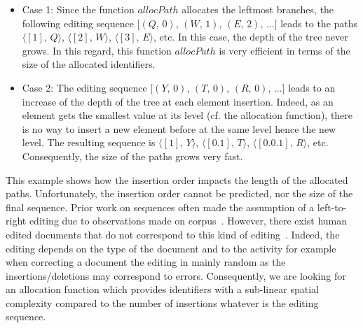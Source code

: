 \begin{itemize}[leftmargin=*]
\item Case 1: Since the function $allocPath$ allocates the leftmost branches,
  the following editing sequence $[(Q,\,0)$, $(W,\,1)$, $(E,\,2)$, $\ldots]$
  leads to the paths $\langle [1],\, Q\rangle$, $\langle [2],\, W\rangle$,
  $\langle [3],\, E\rangle$, etc. In this case, the depth of the tree never
  grows. In this regard, this function $allocPath$ is very efficient in terms
  of the size of the allocated identifiers.

\item Case 2: The editing sequence $[(Y,\,0)$, $(T,\,0)$, $(R,\,0)$, $\ldots]$
  leads to an increase of the depth of the tree at each element
  insertion. Indeed, as an element gets the smallest value at its level
  (cf. the allocation function), there is no way to insert a new element before
  at the same level hence the new level. The resulting sequence is
  $\langle [1],\, Y\rangle$, $\langle [0.1],\, T\rangle$,
  $\langle [0.0.1],\, R \rangle$, etc. Consequently, the size of the paths
  grows very fast.
\end{itemize}

This example shows how the insertion order impacts the length of the allocated
paths. Unfortunately, the insertion order cannot be predicted, nor the size of
the final sequence. Prior work on sequences often made the assumption of a
left-to-right editing due to observations made on
corpus~\cite{preguica2009commutative, weiss2009logoot}. However, there exist
human edited documents that do not correspond to this kind of
editing~\cite{nedelec2013lseq}. Indeed, the editing depends on the type of the
document and to the activity for example when correcting a document the editing
in mainly random as the insertions/deletions may correspond to
errors. Consequently, we are looking for an allocation function which provides
identifiers with a sub-linear spatial complexity compared to the number of
insertions whatever is the editing sequence.

 

